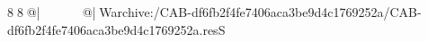 8  8  @|                                                  @| W   archive:/CAB-df6fb2f4fe7406aca3be9d4c1769252a/CAB-df6fb2f4fe7406aca3be9d4c1769252a.resS 